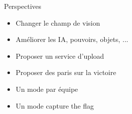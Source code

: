 \begin{frame}[c]{\insertsubsection}
    \begin{block}{Perspectives}
        \begin{itemize}
        \item Changer le champ de vision
        \item Améliorer les IA, pouvoirs, objets, ...
        \item Proposer un service d'upload
        \item Proposer des paris sur la victoire
        \item Un mode par équipe
        \item Un mode capture the flag
        \end{itemize}
    \end{block}
\end{frame}
